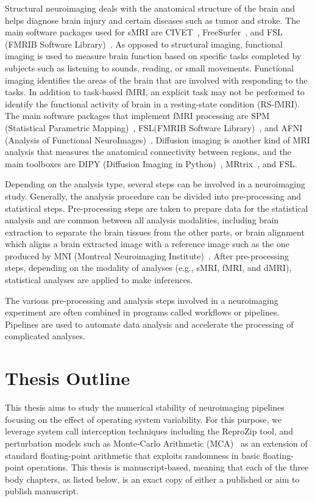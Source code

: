 Structural neuroimaging deals with the anatomical structure of the brain and helps
diagnose brain injury and certain diseases such as tumor and stroke.
The main software packages used for sMRI are 
CIVET~\cite{ad2006civet}, FreeSurfer~\cite{fischl2012freesurfer}, and 
FSL (FMRIB Software Library)~\cite{jenkinson2012fsl}. 
As opposed to structural imaging, functional imaging is used to measure 
brain function based on 
specific tasks completed by subjects such as listening to sounds, 
reading, or small movements. 
Functional imaging identifies the areas of 
the brain that are involved with responding to the tasks. 
In addition to task-based fMRI, an explicit task may not be performed 
to identify the functional activity of brain in a resting-state 
condition (RS-fMRI). The main 
software packages that implement fMRI processing are SPM (Statistical 
Parametric Mapping)~\cite{spm}, FSL(FMRIB Software Library)~\cite{jenkinson2012fsl},
and AFNI (Analysis of Functional 
NeuroImages)~\cite{cox1996afni}. Diffusion imaging is another kind of 
MRI analysis that measures the anatomical connectivity between 
regions, and the main toolboxes are DIPY (Diffusion Imaging in 
Python)~\cite{garyfallidis2014dipy}, MRtrix~\cite{tournier2012mrtrix}, 
and FSL.

Depending on the analysis type, several steps can be involved in a 
neuroimaging study. Generally, the analysis procedure can be divided into 
pre-processing and statistical steps. Pre-processing steps are taken 
to prepare data for the statistical analysis and are common between all 
analysis modalities, including brain extraction to separate the brain 
tissues from the other parts, or brain alignment which aligns a brain 
extracted image with a reference image such as the one produced by 
MNI (Montreal Neuroimaging Institute)~\cite{evans1992anatomical}. 
After pre-processing steps, depending on the
modality of analyses (e.g., sMRI, fMRI, and dMRI), statistical analyses 
are applied to make inferences.

The various pre-processing and analysis steps involved in a 
neuroimaging experiment are often combined in programs called workflows 
or pipelines. Pipelines are used to automate data analysis and accelerate 
the processing of complicated analyses. 


\section{Thesis Outline}

This thesis aims to study the numerical stability of neuroimaging pipelines focusing on the effect
of operating system variability. For this purpose, we leverage system call interception techniques including the
ReproZip tool, and perturbation models such as Monte-Carlo Arithmetic (MCA)~\cite{Parker1997-qq} as an extension of
standard floating-point arithmetic that exploits randomness in basic floating-point operations. 
This thesis is manuscript-based, meaning that each of the three body chapters, as listed below,
is an exact copy of either a published or aim to publish manuscript.

